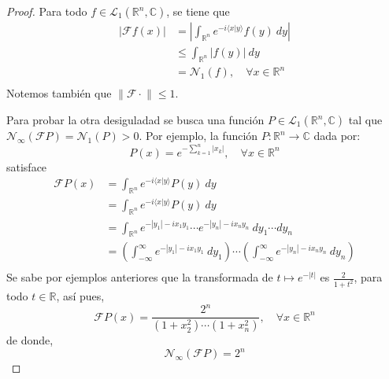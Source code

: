 \documentclass[12pt]{report}
\newcounter{it}
\theoremstyle{largebreak}
\renewcommand{\leq}{\ensuremath{\leqslant}}
\newcommand\abs[1]{\ensuremath{\left|#1\right|}}
\newcommand\cf[3]{\ensuremath{#1:#2\rightarrow#3}}
\newcommand\norm[1]{\ensuremath{\|#1\|}}
\newcommand\pint[2]{\ensuremath{\langle#1| #2\rangle}}
\newcommand{\N}[2]{\ensuremath{\mathcal{N}_{#1}\left(#2\right)}}
\newcommand{\fou}[1]{\ensuremath{\mathcal{F}#1}}
\begin{document}
    \begin{proof}
        Para todo $f\in\mathcal{L}_1(\mathbb{R}^n,\mathbb{C})$, se tiene que
        \begin{equation*}
            \begin{split}
                \abs{\fou{f}(x)}&=\abs{\int_{\mathbb{R}^n}e^{ -i\pint{x}{y}}f(y)\:dy}\\
                &\leq\int_{\mathbb{R}^n}\abs{f(y)}\:dy\\
                &=\N{1}{f},\quad\forall x\in\mathbb{R}^n \\
            \end{split}
        \end{equation*}
        Notemos también que $\norm{\fou{\cdot}}\leq1$.

        Para probar la otra desiguladad se busca una función $P\in\mathcal{L}_1(\mathbb{R}^n,\mathbb{C})$ tal que $\N{\infty}{\fou{P}}=\N{1}{P}>0$. Por ejemplo, la función $\cf{P}{\mathbb{R}^n}{\mathbb{C}}$ dada por:
        \begin{equation*}
            P(x)=e^{ -\sum_{ k=1}^n\abs{x_k}},\quad\forall x\in\mathbb{R}^n
        \end{equation*}
        satisface
        \begin{equation*}
            \begin{split}
                \fou{P}(x)&=\int_{\mathbb{R}^n}e^{ -i\pint{x}{y}}P(y)\:dy\\
                &=\int_{\mathbb{R}^n}e^{ -i\pint{x}{y}}P(y)\:dy\\
                &=\int_{\mathbb{R}^n}e^{ -\abs{y_1}-ix_1y_1}\cdots e^{ -\abs{y_n}-ix_ny_n}\:dy_1\cdots dy_n\\
                &=\left(\int_{-\infty}^{\infty}e^{ -\abs{y_1}-ix_1y_1}\:dy_1\right)\cdots\left(\int_{-\infty}^{\infty}e^{ -\abs{y_n}-ix_ny_n}\:dy_n\right)\\
            \end{split}
        \end{equation*}
        Se sabe por ejemplos anteriores que la transformada de $t\mapsto e^{-\abs{t}}$ es $\frac{2}{1+t^2}$, para todo $t\in\mathbb{R}$, así pues,
        \begin{equation*}
            \fou{P}(x)=\frac{2^n}{(1+x_2^2)\cdots(1+x_n^2)},\quad\forall x\in\mathbb{R}^n
        \end{equation*}
        de donde,
        \begin{equation*}
            \N{\infty}{\fou{P}}=2^n
        \end{equation*}

\end{proof}
\end{document}

